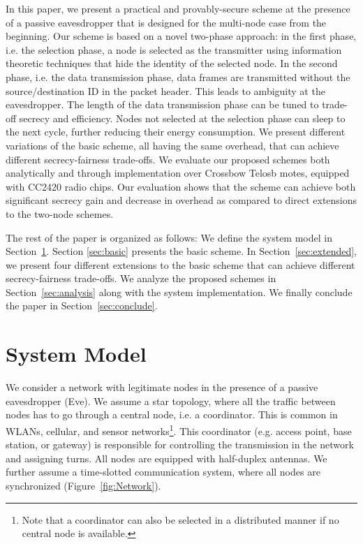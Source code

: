 \documentclass[10pt,letterpaper,conference]{IEEEtran}
\begin{document}
In this paper, we present a practical and provably-secure scheme at the presence
of a passive eavesdropper that is designed for the multi-node case from the
beginning. Our scheme is based on a novel two-phase approach: in the first
phase, i.e. the selection phase, a node is selected as the transmitter using
information theoretic techniques that hide the identity of the selected node. In
the second phase, i.e. the data transmission phase, data frames are transmitted
without the source/destination ID in the packet header. This leads to ambiguity at the
eavesdropper. The length of the data transmission phase can be tuned to trade-off
secrecy and efficiency. Nodes not selected at the selection phase can sleep to
the next cycle, further reducing their energy consumption. We present different
variations of the basic scheme, all having the same overhead, that can achieve
different secrecy-fairness trade-offs.  We evaluate our proposed schemes both
analytically and through implementation over Crossbow Telosb motes, equipped
with CC2420 radio chips. Our evaluation shows that the scheme can achieve
both significant secrecy gain and decrease in overhead as compared to direct extensions to the two-node schemes.

The rest of the paper is organized as follows: We define the system model in
Section~\ref{sec:model}. Section \ref{sec:basic} presents the basic scheme. In
Section~\ref{sec:extended}, we present four different extensions to the basic
scheme that can achieve different secrecy-fairness trade-offs. We analyze the
proposed schemes in Section~\ref{sec:analysis} along with the system implementation. We finally
conclude the paper in
Section~\ref{sec:conclude}.

\section{System Model}
\label{sec:model}

We consider a network with  legitimate nodes in the presence of a passive
eavesdropper (Eve). We assume a star topology, where all the traffic between nodes has
to go through a central node, i.e. a coordinator. This is common in WLANs,
cellular, and sensor networks\footnote{Note that a coordinator can also be
selected in a distributed manner if no central node is available.}. This
coordinator (e.g. access point, base station, or gateway) is responsible for
controlling the transmission in the network and assigning turns. All nodes are
equipped with half-duplex antennas. We further assume a time-slotted
communication system, where all nodes are synchronized
(Figure~\ref{fig:Network}).
\end{document}
